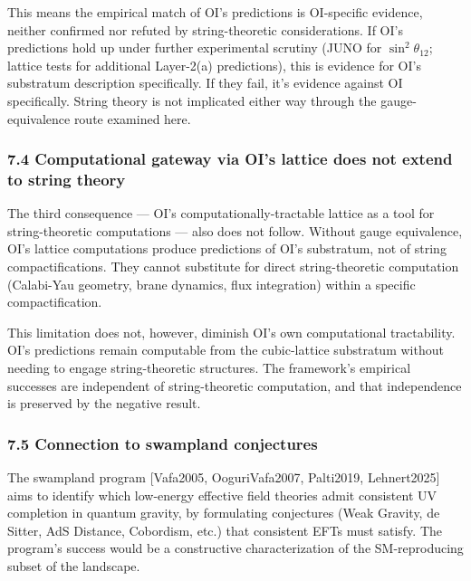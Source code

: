 \documentclass[
]{article}
\begin{document}
This means the empirical match of OI's predictions is OI-specific
evidence, neither confirmed nor refuted by string-theoretic
considerations. If OI's predictions hold up under further experimental
scrutiny (JUNO for \(\sin^2\theta_{12}\); lattice tests for additional
Layer-2(a) predictions), this is evidence for OI's substratum
description specifically. If they fail, it's evidence against OI
specifically. String theory is not implicated either way through the
gauge-equivalence route examined here.

\hypertarget{computational-gateway-via-ois-lattice-does-not-extend-to-string-theory}{%
\subsubsection{7.4 Computational gateway via OI's lattice does not
extend to string
theory}\label{computational-gateway-via-ois-lattice-does-not-extend-to-string-theory}}

The third consequence --- OI's computationally-tractable lattice as a
tool for string-theoretic computations --- also does not follow. Without
gauge equivalence, OI's lattice computations produce predictions of OI's
substratum, not of string compactifications. They cannot substitute for
direct string-theoretic computation (Calabi-Yau geometry, brane
dynamics, flux integration) within a specific compactification.

This limitation does not, however, diminish OI's own computational
tractability. OI's predictions remain computable from the cubic-lattice
substratum without needing to engage string-theoretic structures. The
framework's empirical successes are independent of string-theoretic
computation, and that independence is preserved by the negative result.

\hypertarget{connection-to-swampland-conjectures}{%
\subsubsection{7.5 Connection to swampland
conjectures}\label{connection-to-swampland-conjectures}}

The swampland program {[}Vafa2005, OoguriVafa2007, Palti2019,
Lehnert2025{]} aims to identify which low-energy effective field
theories admit consistent UV completion in quantum gravity, by
formulating conjectures (Weak Gravity, de Sitter, AdS Distance,
Cobordism, etc.) that consistent EFTs must satisfy. The program's
success would be a constructive characterization of the SM-reproducing
subset of the landscape.
\end{document}
